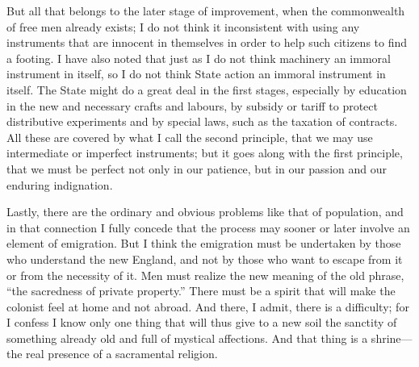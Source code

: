 \documentclass{book}
\begin{document}
But all that belongs to the later stage of improvement, when the commonwealth of free men already exists; I do not think it inconsistent with using any instruments that are innocent in themselves in order to help such citizens to find a footing. I have also noted that just as I do not think machinery an immoral instrument in itself, so I do not think State action an immoral instrument in itself. The State might do a great deal in the first stages, especially by education in the new and necessary crafts and labours, by subsidy or tariff to protect distributive experiments and by special laws, such as the taxation of contracts. All these are covered by what I call the second principle, that we may use intermediate or imperfect instruments; but it goes along with the first principle, that we must be perfect not only in our patience, but in our passion and our enduring indignation.

Lastly, there are the ordinary and obvious problems like that of population, and in that connection I fully concede that the process may sooner or later involve an element of emigration. But I think the emigration must be undertaken by those who understand the new England, and not by those who want to escape from it or from the necessity of it. Men must realize the new meaning of the old phrase, “the sacredness of private property.” There must be a spirit that will make the colonist feel at home and not abroad. And there, I admit, there is a difficulty; for I confess I know only one thing that will thus give to a new soil the sanctity of something already old and full of mystical affections. And that thing is a shrine—the real presence of a sacramental religion.
\end{document}
